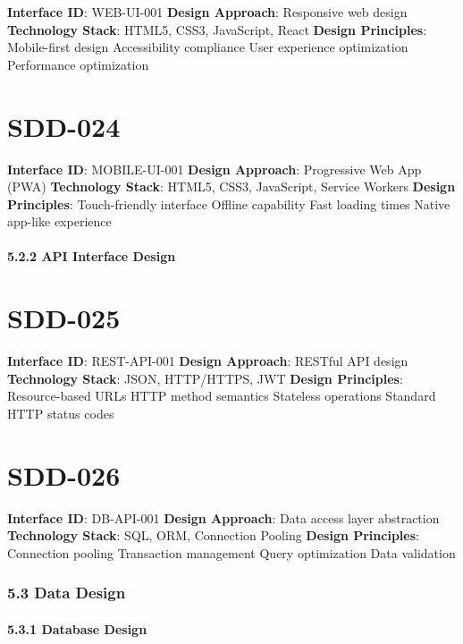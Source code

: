 \textbf{Interface ID}: WEB-UI-001
\textbf{Design Approach}: Responsive web design
\textbf{Technology Stack}: HTML5, CSS3, JavaScript, React
\textbf{Design Principles}:
Mobile-first design
Accessibility compliance
User experience optimization
Performance optimization

\section{SDD-024}\label{SDD-024}

\textbf{Interface ID}: MOBILE-UI-001
\textbf{Design Approach}: Progressive Web App (PWA)
\textbf{Technology Stack}: HTML5, CSS3, JavaScript, Service Workers
\textbf{Design Principles}:
Touch-friendly interface
Offline capability
Fast loading times
Native app-like experience\\

\paragraph{5.2.2 API Interface Design}

\section{SDD-025}\label{SDD-025}

\textbf{Interface ID}: REST-API-001
\textbf{Design Approach}: RESTful API design
\textbf{Technology Stack}: JSON, HTTP/HTTPS, JWT
\textbf{Design Principles}:
Resource-based URLs
HTTP method semantics
Stateless operations
Standard HTTP status codes

\section{SDD-026}\label{SDD-026}

\textbf{Interface ID}: DB-API-001
\textbf{Design Approach}: Data access layer abstraction
\textbf{Technology Stack}: SQL, ORM, Connection Pooling
\textbf{Design Principles}:
Connection pooling
Transaction management
Query optimization
Data validation\\

\subsubsection{5.3 Data Design}

\paragraph{5.3.1 Database Design}

